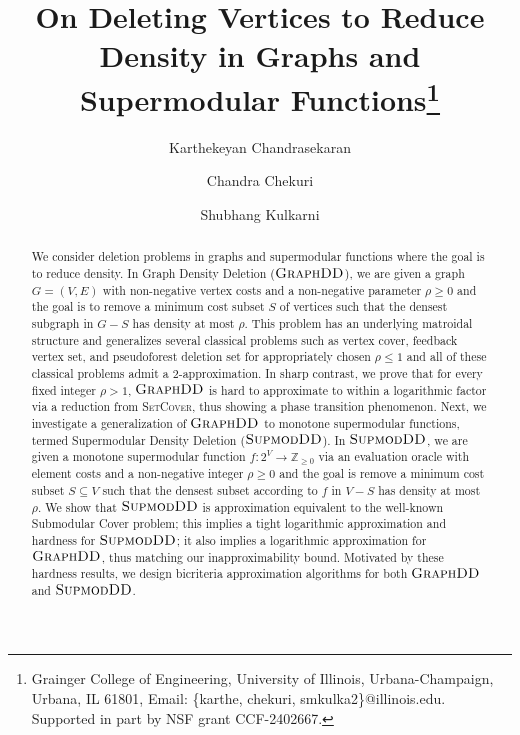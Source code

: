 \documentclass{article}
\title{On Deleting Vertices to Reduce Density in Graphs and Supermodular Functions\thanks{Grainger College of Engineering, University of Illinois, Urbana-Champaign, Urbana, IL 61801, Email: \{karthe, chekuri, smkulka2\}@illinois.edu. Supported in part by NSF grant CCF-2402667.} }
\author{Karthekeyan Chandrasekaran
\and Chandra Chekuri
\and Shubhang Kulkarni
}
\date{}
\newcommand{\dds}{\ensuremath{\textsc{GraphDD}}\xspace}
\newcommand{\sdds}{\ensuremath{\textsc{SupmodDD}}\xspace}
\newcommand{\setcover}{\textsc{SetCover}\xspace}
\begin{document}
\maketitle
\begin{abstract}
  We consider deletion problems in graphs and supermodular functions where the goal is to reduce density. 
  In Graph Density Deletion (\dds), we are given a graph $G=(V,E)$ with non-negative vertex costs and a non-negative parameter $\rho \ge 0$ and the goal is to remove a minimum cost subset $S$ of vertices such that the densest subgraph in $G-S$ has density at most $\rho$. This problem has an underlying matroidal structure and generalizes several classical problems such as vertex cover, feedback vertex set, and pseudoforest deletion set for appropriately chosen $\rho \le 1$ and all of these classical problems admit a $2$-approximation. In sharp contrast, we prove that for every fixed integer $\rho > 1$, \dds is hard to approximate to within a logarithmic factor via a reduction from \setcover, thus showing a phase transition phenomenon. Next, we investigate a generalization of \dds to monotone supermodular functions, termed Supermodular Density Deletion (\sdds). In \sdds, we are given a monotone supermodular function $f:2^V \rightarrow \mathbb{Z}_{\ge 0}$ via an evaluation oracle with element costs and a non-negative integer $\rho \ge 0$ and the goal is remove a minimum cost subset $S \subseteq V$ such that the densest subset according to $f$ in $V-S$ has density at most $\rho$. We show that \sdds is approximation equivalent to the well-known {\sc Submodular Cover} problem; this implies a tight logarithmic approximation and hardness for \sdds; it also implies a logarithmic approximation for \dds, thus matching our inapproximability bound. Motivated by these hardness results, we design bicriteria approximation algorithms for both \dds and \sdds. 
\end{abstract} 
\setcounter{page}{1}
\end{document}
